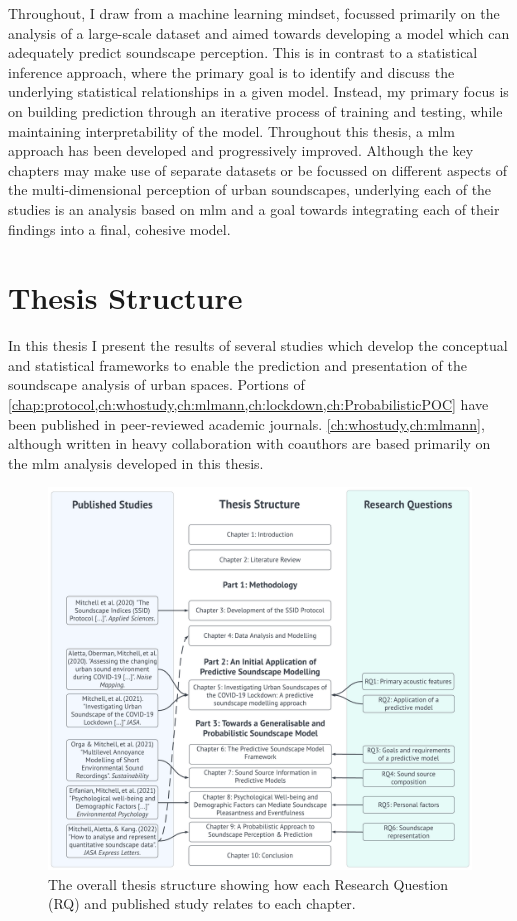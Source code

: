 Throughout, I draw from a machine learning mindset, focussed primarily on the analysis of a large-scale dataset and aimed towards developing a model which can adequately predict soundscape perception. This is in contrast to a statistical inference approach, where the primary goal is to identify and discuss the underlying statistical relationships in a given model. Instead, my primary focus is on building prediction through an iterative process of training and testing, while maintaining interpretability of the model. Throughout this thesis, a \gls{mlm} approach has been developed and progressively improved. Although the key chapters may make use of separate datasets or be focussed on different aspects of the multi-dimensional perception of urban soundscapes, underlying each of the studies is an analysis based on \gls{mlm} and a goal towards integrating each of their findings into a final, cohesive model. 


\section{Thesis Structure}

In this thesis I present the results of several studies which develop the conceptual and statistical frameworks to enable the prediction and presentation of the soundscape analysis of urban spaces. Portions of \cref{chap:protocol,ch:whostudy,ch:mlmann,ch:lockdown,ch:ProbabilisticPOC} have been published in peer-reviewed academic journals. \cref{ch:whostudy,ch:mlmann}, although written in heavy collaboration with coauthors are based primarily on the \gls{mlm} analysis developed in this thesis.

\begin{figure}
  \centering
  \includegraphics[width=\textwidth]{Figures/Thesis Structure 2022-05-28.png}
  \caption{The overall thesis structure showing how each Research Question (RQ) and published study relates to each chapter. \label{fig:thesisStructure}}
\end{figure}

